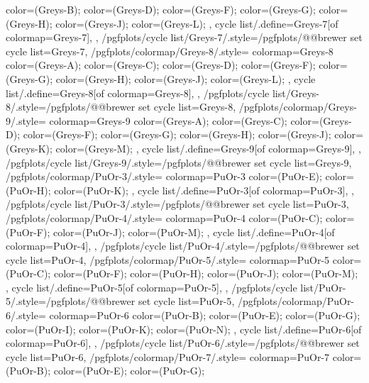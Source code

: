 {{{      color=(Greys-B);
      color=(Greys-D);
      color=(Greys-F);
      color=(Greys-G);
      color=(Greys-H);
      color=(Greys-J);
      color=(Greys-L);
    },
    cycle list/.define={Greys-7}{[of colormap=Greys-7]},
  },
  /pgfplots/cycle list/Greys-7/.style={/pgfplots/@@brewer set cycle list={Greys-7}},
  /pgfplots/colormap/Greys-8/.style={
    colormap={Greys-8}{
      color=(Greys-A);
      color=(Greys-C);
      color=(Greys-D);
      color=(Greys-F);
      color=(Greys-G);
      color=(Greys-H);
      color=(Greys-J);
      color=(Greys-L);
    },
    cycle list/.define={Greys-8}{[of colormap=Greys-8]},
  },
  /pgfplots/cycle list/Greys-8/.style={/pgfplots/@@brewer set cycle list={Greys-8}},
  /pgfplots/colormap/Greys-9/.style={
    colormap={Greys-9}{
      color=(Greys-A);
      color=(Greys-C);
      color=(Greys-D);
      color=(Greys-F);
      color=(Greys-G);
      color=(Greys-H);
      color=(Greys-J);
      color=(Greys-K);
      color=(Greys-M);
    },
    cycle list/.define={Greys-9}{[of colormap=Greys-9]},
  },
  /pgfplots/cycle list/Greys-9/.style={/pgfplots/@@brewer set cycle list={Greys-9}},
  /pgfplots/colormap/PuOr-3/.style={
    colormap={PuOr-3}{
      color=(PuOr-E);
      color=(PuOr-H);
      color=(PuOr-K);
    },
    cycle list/.define={PuOr-3}{[of colormap=PuOr-3]},
  },
  /pgfplots/cycle list/PuOr-3/.style={/pgfplots/@@brewer set cycle list={PuOr-3}},
  /pgfplots/colormap/PuOr-4/.style={
    colormap={PuOr-4}{
      color=(PuOr-C);
      color=(PuOr-F);
      color=(PuOr-J);
      color=(PuOr-M);
    },
    cycle list/.define={PuOr-4}{[of colormap=PuOr-4]},
  },
  /pgfplots/cycle list/PuOr-4/.style={/pgfplots/@@brewer set cycle list={PuOr-4}},
  /pgfplots/colormap/PuOr-5/.style={
    colormap={PuOr-5}{
      color=(PuOr-C);
      color=(PuOr-F);
      color=(PuOr-H);
      color=(PuOr-J);
      color=(PuOr-M);
    },
    cycle list/.define={PuOr-5}{[of colormap=PuOr-5]},
  },
  /pgfplots/cycle list/PuOr-5/.style={/pgfplots/@@brewer set cycle list={PuOr-5}},
  /pgfplots/colormap/PuOr-6/.style={
    colormap={PuOr-6}{
      color=(PuOr-B);
      color=(PuOr-E);
      color=(PuOr-G);
      color=(PuOr-I);
      color=(PuOr-K);
      color=(PuOr-N);
    },
    cycle list/.define={PuOr-6}{[of colormap=PuOr-6]},
  },
  /pgfplots/cycle list/PuOr-6/.style={/pgfplots/@@brewer set cycle list={PuOr-6}},
  /pgfplots/colormap/PuOr-7/.style={
    colormap={PuOr-7}{
      color=(PuOr-B);
      color=(PuOr-E);
      color=(PuOr-G);
}}}
